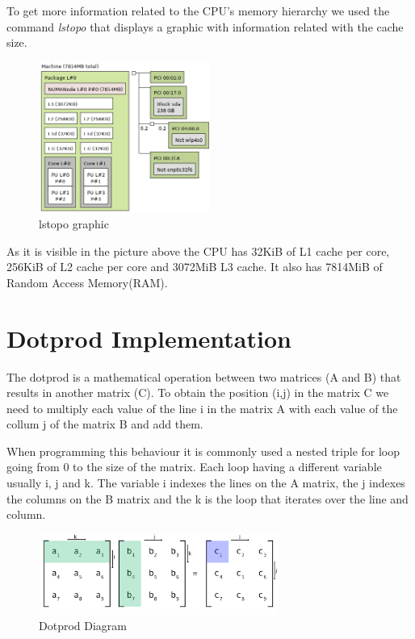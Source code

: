 \documentclass[a4paper]{report}
\begin{document}
To get more information related to the CPU's memory hierarchy we used the
command \textit{lstopo} that displays a graphic with information related with
the cache size.
\begin{figure}[H]
    \centering
        \includegraphics[width=0.5\textwidth]{images/lstopo.png}
        \caption{lstopo graphic}
\end{figure}

As it is visible in the picture above the CPU has 32KiB of L1 cache per core,
256KiB of L2 cache per core and 3072MiB L3 cache. It also has 7814MiB of Random
Access Memory(RAM).

\chapter{Dotprod Implementation}
The dotprod is a mathematical operation between two matrices (A and B) that results in
another matrix (C). To obtain the position (i,j) in the matrix C we need to
multiply each value of the line i in the matrix A with each value of the collum
j of the matrix B and add them.

When programming this behaviour it is commonly used a nested triple for loop
going from 0 to the size of the matrix. Each loop having a different variable
usually i, j and k. The variable i indexes the lines on the A matrix, the j
indexes the columns on the B matrix and the k is the loop that iterates over the
line and column.

\begin{figure}[H]
    \centering
        \includegraphics[width=0.7\textwidth]{images/matrix_mult.png}
        \caption{Dotprod Diagram}
\end{figure}
\end{document}
